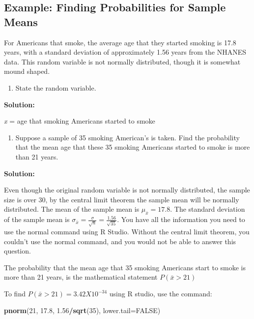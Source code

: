 \documentclass[]{book}
\newenvironment{Shaded}{\begin{snugshade}}{\end{snugshade}}
\newcommand{\DataTypeTok}[1]{\textcolor[rgb]{0.13,0.29,0.53}{#1}}
\newcommand{\DecValTok}[1]{\textcolor[rgb]{0.00,0.00,0.81}{#1}}
\newcommand{\FloatTok}[1]{\textcolor[rgb]{0.00,0.00,0.81}{#1}}
\newcommand{\KeywordTok}[1]{\textcolor[rgb]{0.13,0.29,0.53}{\textbf{#1}}}
\newcommand{\NormalTok}[1]{#1}
\newcommand{\OperatorTok}[1]{\textcolor[rgb]{0.81,0.36,0.00}{\textbf{#1}}}
\newcommand{\OtherTok}[1]{\textcolor[rgb]{0.56,0.35,0.01}{#1}}
\providecommand{\tightlist}{%
  \setlength{\itemsep}{0pt}\setlength{\parskip}{0pt}}
\begin{document}
\hypertarget{example-finding-probabilities-for-sample-means-1}{%
\subsection{Example: Finding Probabilities for Sample Means}\label{example-finding-probabilities-for-sample-means-1}}

For Americans that smoke, the average age that they started smoking is 17.8 years, with a standard deviation of approximately 1.56 years from the NHANES data. This random variable is not normally distributed, though it is somewhat mound shaped.

\begin{enumerate}
\def\labelenumi{\alph{enumi}.}
\tightlist
\item
  State the random variable.
\end{enumerate}

\textbf{Solution:}

\emph{x} = age that smoking Americans started to smoke

\begin{enumerate}
\def\labelenumi{\alph{enumi}.}
\setcounter{enumi}{1}
\tightlist
\item
  Suppose a sample of 35 smoking American's is taken. Find the probability that the mean age that these 35 smoking Americans started to smoke is more than 21 years.
\end{enumerate}

\textbf{Solution:}

Even though the original random variable is not normally distributed, the sample size is over 30, by the central limit theorem the sample mean will be normally distributed. The mean of the sample mean is \(\mu_{\bar{x}}=17.8\). The standard deviation of the sample mean is \(\sigma_{\bar{x}}=\frac{\sigma}{\sqrt{n}}=\frac{1.56}{\sqrt{35}}\). You have all the information you need to use the normal command using R Studio. Without the central limit theorem, you couldn't use the normal command, and you would not be able to answer this question.

The probability that the mean age that 35 smoking Americans start to smoke is more than 21 years, is the mathematical statement \(P(\bar{x}>21)\)

To find \(P(\bar{x}>21)= 3.42X10^{-34}\) using R studio, use the command:

\begin{Shaded}
\begin{Highlighting}[]
\KeywordTok{pnorm}\NormalTok{(}\DecValTok{21}\NormalTok{, }\FloatTok{17.8}\NormalTok{, }\FloatTok{1.56}\OperatorTok{/}\KeywordTok{sqrt}\NormalTok{(}\DecValTok{35}\NormalTok{), }\DataTypeTok{lower.tail=}\OtherTok{FALSE}\NormalTok{)}
\end{Highlighting}
\end{Shaded}
\end{document}
